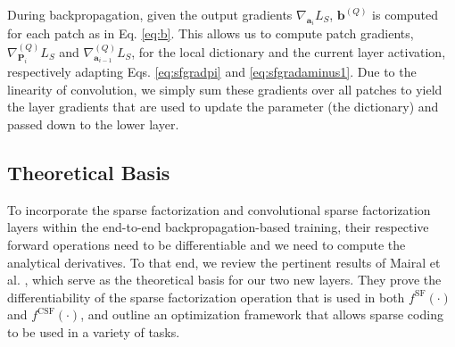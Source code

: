 \documentclass[10pt,twocolumn,letterpaper]{article}
\DeclareRobustCommand{\jason}[1]{{\hl{\;$^{\text{jason}}$ #1}}}
\newcommand{\TODO}[1]{\textcolor{red}{\textbf{TODO: #1}}}
\renewcommand{\vec}{\mathbf}
\newcommand{\grad}[2]{\nabla_{\!\! #1} #2}
\newcommand{\gradpatch}[3]{\nabla_{\!\! #1}^{#2} #3}
\renewcommand{\P}{\vec{P}}
\renewcommand{\a}{\vec{a}}
\renewcommand{\b}{\vec{b}}
\newcommand{\fSF}{^{\text{SF}}}
\newcommand{\fCSF}{^{\text{CSF}}}
\begin{document}

During backpropagation, given the output gradients $\grad{\a_{i}}{L_S}$, $\b^{(Q)}$ is computed for each patch as in Eq. \ref{eq:b}.  This allows us to compute patch gradients, $\gradpatch{\P_i}{(Q)}{L_S}$ and $\gradpatch{\a_{i-1}}{(Q)}{L_S}$, for the local dictionary and the current layer activation, respectively adapting Eqs. \ref{eq:sfgradpi} and \ref{eq:sfgradaminus1}.  Due to the linearity of convolution, we simply sum these gradients over all patches to yield the layer gradients that are used to update the parameter (the dictionary) and passed down to the lower layer.





\subsection{Theoretical Basis}
\label{sec:sparse:theory}



To incorporate the sparse factorization and convolutional sparse factorization layers within the end-to-end backpropagation-based training, their respective forward operations need to be differentiable and we need to compute the analytical derivatives.
%
To that end, we review the pertinent results of Mairal et al. \cite{MaBaPoTPAMI2012}, which serve as the theoretical basis for our two new layers.  They prove
the differentiability of the sparse factorization operation that is used in both $f\fSF(\cdot)$ and $f\fCSF(\cdot)$, and outline an optimization framework that allows sparse coding to be used in a variety of tasks. 
\end{document}
